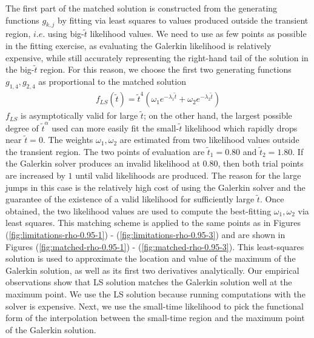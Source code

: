 The first part of the matched solution is constructed from the
generating functions $g_{k,j}$ by fitting via least squares to values
produced outside the transient region, $i.e.$ using big-$\tilde{t}$
likelihood values. We need to use as few points as possible in the
fitting exercise, as evaluating the Galerkin likelihood is relatively
expensive, while still accurately representing the right-hand tail of
the solution in the big-$\tilde{t}$ region. For this reason, we choose
the first two generating functions $g_{1,4}, g_{2,4}$ as proportional
to the matched solution
\begin{align*}
  f_{LS}(\tilde{t}) = \tilde{t}^4 \left( \omega_1 e^{-\lambda_1\tilde{t}} + \omega_2 e^{-\lambda_2\tilde{t}}\right)
\end{align*}
$f_{LS}$ is asymptotically valid for large $\tilde{t}$; on the other
hand, the largest possible degree of $\tilde{t}^{\alpha}$ used can
more easily fit the small-$\tilde{t}$ likelihood which rapidly drops
near $\tilde{t} = 0$. The weights $\omega_{1}, \omega_{2}$ are
estimated from two likelihood values outside the transient region. The
two points of evaluation are $\tilde{t}_1 = 0.80$ and
$\tilde{t}_2 = 1.80$. If the Galerkin solver produces an invalid
likelihood at $0.80$, then both trial points are increased by $1$
until valid likelihoods are produced. The reason for the large jumps
in this case is the relatively high cost of using the Galerkin solver
and the guarantee of the existence of a valid likelihood for
sufficiently large $\tilde{t}$. Once obtained, the two likelihood
values are used to compute the best-fitting $\omega_{1}, \omega_{2}$
via least squares. This matching scheme is applied to the same points
as in Figures (\ref{fig:limitations-rho-0.95-1}) -
(\ref{fig:limitations-rho-0.95-3}) and are shown in Figures
(\ref{fig:matched-rho-0.95-1}) - (\ref{fig:matched-rho-0.95-3}). This
least-squares solution is used to approximate the location and value
of the maximum of the Galerkin solution, as well as its first two
derivatives analytically. Our empirical observations show that LS
solution matches the Galerkin solution well at the maximum point. We
use the LS solution because running computations with the solver is
expensive. Next, we use the small-time likelihood to pick the
functional form of the interpolation between the small-time region and
the maximum point of the Galerkin solution.


